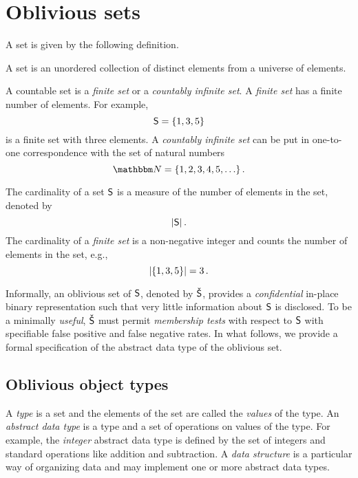 \documentclass[ ../main.tex]{subfiles}
\begin{document}
\section{Oblivious sets}
\label{sec:ob_set_def}
A set is given by the following definition.
\begin{definition}
A set is an unordered collection of distinct elements from a universe of elements.
\end{definition}

A countable set is a \emph{finite set} or a \emph{countably infinite set}. A \emph{finite set} has a finite number of elements. For example,
\[
    \Set{S} = \{ 1, 3, 5 \}
\]
is a finite set with three elements. A \emph{countably infinite set} can be put in one-to-one correspondence with the set of natural numbers
\begin{equation}
    \NatSet = \{1,2,3,4,5,\ldots\}\,.
\end{equation}

The cardinality of a set $\Set{S}$ is a measure of the number of elements in the set, denoted by
\begin{equation}
    \Card{\Set{S}}\,.
\end{equation}
The cardinality of a \emph{finite set} is a non-negative integer and counts the number of elements in the set, e.g.,
\[
    \lvert\left\{ 1, 3, 5\right\}\rvert = 3\,.
\]

Informally, an oblivious set of $\Set{S}$, denoted by $\OSet{S}$, provides a \emph{confidential} in-place binary representation such that very little information about $\Set{S}$ is disclosed. To be a minimally \emph{useful}, $\OSet{S}$ must permit \emph{membership tests} with respect to $\Set{S}$ with specifiable false positive and false negative rates. In what follows, we provide a formal specification of the abstract data type of the oblivious set.

\subsection{Oblivious object types}
A \emph{type} is a set and the elements of the set are called the \emph{values} of the type. An \emph{abstract data type} is a type and a set of operations on values of the type. For example, the \emph{integer} abstract data type is defined by the set of integers and standard operations like addition and subtraction. A \emph{data structure} is a particular way of organizing data and may implement one or more abstract data types.
\end{document}
